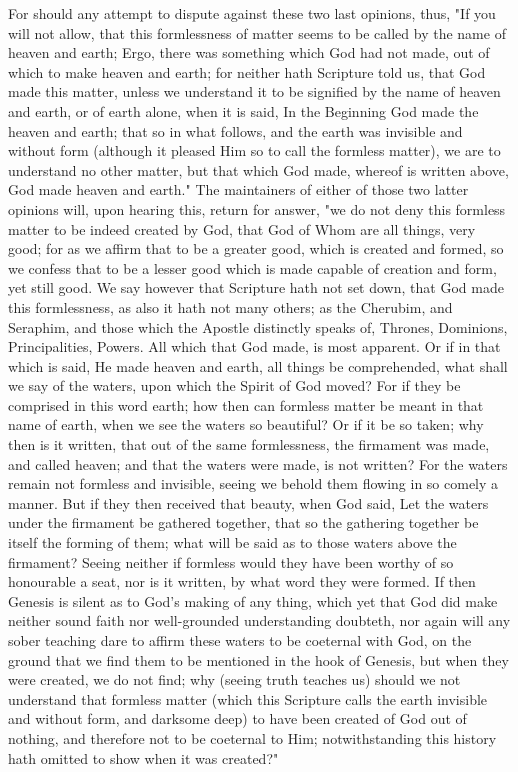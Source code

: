 \documentclass[b5paper,openright,12pt,twoside]{book}
\begin{document}
For should any attempt to dispute against these two last opinions, thus,
"If you will not allow, that this formlessness of matter seems to be
called by the name of heaven and earth; Ergo, there was something which
God had not made, out of which to make heaven and earth; for neither
hath Scripture told us, that God made this matter, unless we understand
it to be signified by the name of heaven and earth, or of earth alone,
when it is said, In the Beginning God made the heaven and earth; that so
in what follows, and the earth was invisible and without form (although
it pleased Him so to call the formless matter), we are to understand
no other matter, but that which God made, whereof is written above, God
made heaven and earth." The maintainers of either of those two latter
opinions will, upon hearing this, return for answer, "we do not deny
this formless matter to be indeed created by God, that God of Whom are
all things, very good; for as we affirm that to be a greater good, which
is created and formed, so we confess that to be a lesser good which is
made capable of creation and form, yet still good. We say however that
Scripture hath not set down, that God made this formlessness, as also it
hath not many others; as the Cherubim, and Seraphim, and those which
the Apostle distinctly speaks of, Thrones, Dominions, Principalities,
Powers. All which that God made, is most apparent. Or if in that which
is said, He made heaven and earth, all things be comprehended, what
shall we say of the waters, upon which the Spirit of God moved? For if
they be comprised in this word earth; how then can formless matter be
meant in that name of earth, when we see the waters so beautiful? Or
if it be so taken; why then is it written, that out of the same
formlessness, the firmament was made, and called heaven; and that the
waters were made, is not written? For the waters remain not formless and
invisible, seeing we behold them flowing in so comely a manner. But if
they then received that beauty, when God said, Let the waters under the
firmament be gathered together, that so the gathering together be itself
the forming of them; what will be said as to those waters above the
firmament? Seeing neither if formless would they have been worthy of so
honourable a seat, nor is it written, by what word they were formed. If
then Genesis is silent as to God's making of any thing, which yet
that God did make neither sound faith nor well-grounded understanding
doubteth, nor again will any sober teaching dare to affirm these
waters to be coeternal with God, on the ground that we find them to be
mentioned in the hook of Genesis, but when they were created, we do
not find; why (seeing truth teaches us) should we not understand that
formless matter (which this Scripture calls the earth invisible and
without form, and darksome deep) to have been created of God out of
nothing, and therefore not to be coeternal to Him; notwithstanding this
history hath omitted to show when it was created?"
\end{document}
